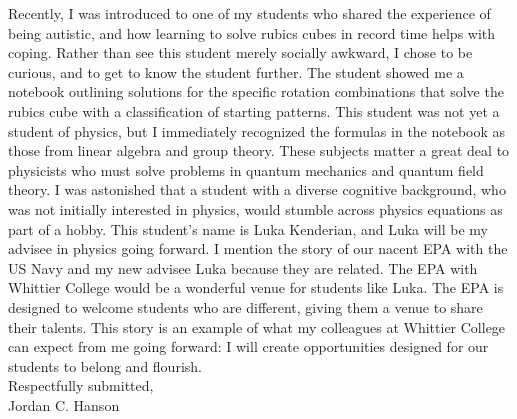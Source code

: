 \documentclass[../main.tex]{subfiles}
\begin{document}
Recently, I was introduced to one of my students who shared the experience of being autistic, and how learning to solve rubics cubes in record time helps with coping.  Rather than see this student merely socially awkward, I chose to be curious, and to get to know the student further.  The student showed me a notebook outlining solutions for the specific rotation combinations that solve the rubics cube with a classification of starting patterns.  This student was not yet a student of physics, but I immediately recognized the formulas in the notebook as those from linear algebra and group theory.  These subjects matter a great deal to physicists who must solve problems in quantum mechanics and quantum field theory.  I was astonished that a student with a diverse cognitive background, who was not initially interested in physics, would stumble across physics equations as part of a hobby.  This student's name is Luka Kenderian, and Luka will be my advisee in physics going forward.  I mention the story of our nacent EPA with the US Navy and my new advisee Luka because they are related.  The EPA with Whittier College would be a wonderful venue for students like Luka.  The EPA is designed to welcome students who are different, giving them a venue to share their talents.  This story is an example of what my colleagues at Whittier College can expect from me going forward: I will create opportunities designed for our students to belong and flourish.
\\ \vspace{0.25cm}
Respectfully submitted,
\\ \vspace{0.25cm}
Jordan C. Hanson
\end{document}
